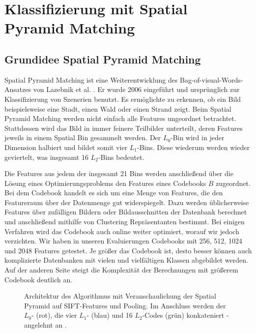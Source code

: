 \section{Klassifizierung mit Spatial Pyramid Matching}

\subsection{Grundidee Spatial Pyramid Matching}

Spatial Pyramid Matching ist eine Weiterentwicklung des Bag-of-visual-Words-Ansatzes von Lazebnik et al. \cite{lsp06}. Er wurde 2006 eingeführt und ursprünglich zur Klassifizierung von Szenerien benutzt. Es ermöglichte zu erkennen, ob ein Bild beispielsweise eine Stadt, einen Wald oder einen Strand zeigt. Beim Spatial Pyramid Matching werden nicht einfach alle Features ungeordnet betrachtet. Stattdessen wird das Bild in immer feinere Teilbilder unterteilt, deren Features jeweils in einem Spatial Bin gesammelt werden. Der $L_0$-Bin wird in jeder Dimension halbiert und bildet somit vier $L_1$-Bins. Diese wiederum werden wieder geviertelt, was insgesamt 16 $L_2$-Bins bedeutet.

Die Features aus jedem der insgesamt 21 Bins werden anschließend über die Lösung eines Optimierungsproblems den Features eines Codebooks $B$ zugeordnet. Bei dem Codebook handelt es sich um eine Menge von Features, die den Featureraum über der Datenmenge gut widerspiegelt. Dazu werden üblicherweise Features über zufälligen Bildern oder Bildausschnitten der Datenbank berechnet und anschließend mithilfe von Clustering Repräsentanten bestimmt. Bei einigen Verfahren wird das Codebook auch online weiter optimiert, worauf wir jedoch verzichten. Wir haben in unseren Evaluierungen Codebooks mit 256, 512, 1024 und 2048 Features getestet. Je größer das Codebook ist, desto besser können auch komplizierte Datenbanken mit vielen und vielfältigen Klassen abgebildet werden. Auf der anderen Seite steigt die Komplexität der Berechnungen mit größerem Codebook deutlich an.

\begin{figure}
	\centering
	\caption{Architektur des Algorithmus mit Veranschaulichung der Spatial Pyramid auf SIFT-Features und Pooling. Im Anschluss werden der $L_0$- (rot), die vier $L_1$- (blau) und 16 $L_2$-Codes (grün) konkateniert - angelehnt an \cite{yygh09}.}
	\label{img:architecture}
\end{figure}

